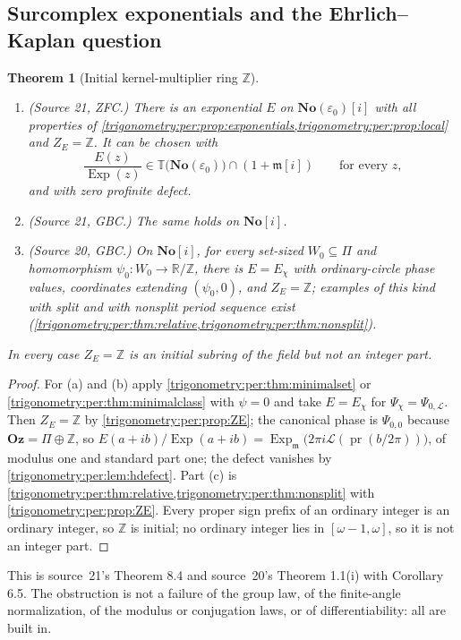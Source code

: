\documentclass[11pt,letterpaper]{article}
\numberwithin{equation}{section}
\newtheorem{theorem}{Theorem}[section]
\theoremstyle{definition}
\theoremstyle{remark}
\newcommand{\No}{\mathbf{No}}
\newcommand{\Oz}{\mathbf{Oz}}
\newcommand{\R}{\mathbb R}
\newcommand{\Z}{\mathbb Z}
\newcommand{\mm}{\mathfrak m}
\newcommand{\TT}{\mathbb T}
\newcommand{\eps}{\varepsilon}
\newcommand{\Exp}{\operatorname{Exp}}
\newcommand{\Ex}{\operatorname{Exp}_{\mm}}
\newcommand{\pr}{\operatorname{pr}}
\newcommand{\cL}{\mathcal L}
\begin{document}
\subsection{Surcomplex exponentials and the Ehrlich--Kaplan question}\label{trigonometry:per:sec:ek}
\begin{theorem}[Initial kernel-multiplier ring $\Z$]\label{trigonometry:per:thm:robustness}
\begin{enumerate}[label=(\alph*)]
\item \emph{(Source 21, ZFC.)} There is an exponential $E$ on $\No(\eps_0)[i]$ with all properties of
 \cref{trigonometry:per:prop:exponentials,trigonometry:per:prop:local} and $Z_E=\Z$. It can be chosen
 with
 \begin{equation}\label{trigonometry:per:eq:invisible}
  \frac{E(z)}{\Exp(z)}\in\TT\bigl(\No(\eps_0)\bigr)\cap(1+\mm[i])\qquad\text{for every }z ,
 \end{equation}
 and with zero profinite defect.
\item \emph{(Source 21, GBC.)} The same holds on $\No[i]$.
\item \emph{(Source 20, GBC.)} On $\No[i]$, for every set-sized $W_0\subseteq\Pi$ and homomorphism
 $\psi_0:W_0\to\R/\Z$, there is $E=E_\chi$ with ordinary-circle phase values, coordinates extending
 $(\psi_0,0)$, and $Z_E=\Z$; examples of this kind with split and with nonsplit period sequence exist
 (\cref{trigonometry:per:thm:relative,trigonometry:per:thm:nonsplit}).
\end{enumerate}
In every case $Z_E=\Z$ is an initial subring of the field but not an integer part.
\end{theorem}
\begin{proof}
For (a) and (b) apply \cref{trigonometry:per:thm:minimalset} or \cref{trigonometry:per:thm:minimalclass}
with $\psi=0$ and take $E=E_\chi$ for $\Psi_\chi=\Psi_{0,\cL}$. Then $Z_E=\Z$ by
\cref{trigonometry:per:prop:ZE}; the canonical phase is $\Psi_{0,0}$ because $\Oz=\Pi\oplus\Z$, so
$E(a+ib)/\Exp(a+ib)=\Ex\bigl(2\pi i\cL(\pr(b/2\pi))\bigr)$, of modulus one and standard part one; the
defect vanishes by \cref{trigonometry:per:lem:hdefect}. Part (c) is
\cref{trigonometry:per:thm:relative,trigonometry:per:thm:nonsplit} with
\cref{trigonometry:per:prop:ZE}. Every proper sign prefix of an ordinary integer is an ordinary integer,
so $\Z$ is initial; no ordinary integer lies in $[\omega-1,\omega]$, so it is not an integer part.
\end{proof}
This is source~21's Theorem 8.4 and source~20's Theorem 1.1(i) with Corollary 6.5. The obstruction is
not a failure of the group law, of the finite-angle normalization, of the modulus or conjugation laws,
or of differentiability: all are built in.
\end{document}
